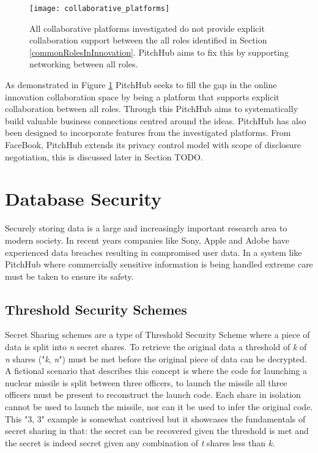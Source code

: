 \begin{figure}[ht]
    \centering
    \texttt{[image: collaborative\_platforms]}
    \caption{All collaborative platforms investigated do not provide explicit collaboration support between the all roles identified in Section \ref{commonRolesInInnovation}. PitchHub aims to fix this by supporting networking between all roles. }
    \label{fig:collaborative_platforms}
\end{figure}

As demonstrated in Figure \ref{fig:collaborative_platforms} PitchHub seeks to fill the gap in the online innovation collaboration space by being a platform that supports explicit collaboration between all roles. Through this PitchHub aims to systematically build valuable business connections centred around the ideas. PitchHub has also been designed to incorporate features from the investigated platforms. From FaceBook, PitchHub extends its privacy control model with scope of disclosure negotiation, this is discussed later in Section TODO.

\section{Database Security}\label{S:databaseSecurity}
Securely storing data is a large and increasingly important research area to modern society. In recent years companies like Sony, Apple and Adobe have experienced data breaches resulting in compromised user data. In a system like PitchHub where commercially sensitive information is being handled extreme care must be taken to ensure its safety.

\subsection{Threshold Security Schemes}
Secret Sharing schemes are a type of Threshold Security Scheme where a piece of data is split into \textit{n} secret shares. To retrieve the original data a threshold of \textit{k} of \textit{n} shares ("\textit{k}, \textit{n}") must be met before the original piece of data can be decrypted. A fictional scenario that describes this concept is where the code for launching a nuclear missile is split between three officers, to launch the missile all three officers must be present to reconstruct the launch code. Each share in isolation cannot be used to launch the missile, nor can it be used to infer the original code. This "3, 3" example is somewhat contrived but it showcases the fundamentals of secret sharing in that: the secret can be recovered given the threshold is met and the secret is indeed secret given any combination of \textit{t} shares less than \textit{k}.

